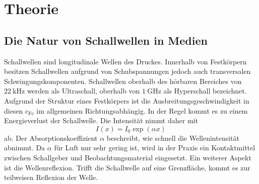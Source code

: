 
\section{Theorie}
\label{sec:Theorie}
\subsection{Die Natur von Schallwellen in Medien}
Schallwellen sind longitudinale Wellen des Druckes.
 Innerhalb von Festkörpern besitzen Schallwellen
aufgrund von Schubspannungen jedoch auch transversalen Schwingungskomponenten.
Schallwellen oberhalb des hörbaren Bereiches von $\SI{22}{\kilo\hertz}$ werden als
Ultraschall, oberhalb von $\SI{1}{\giga\hertz}$ als Hyperschall bezeichnet.
Aufgrund der Struktur eines Festkörpers ist die Ausbreitungsgeschwindigkeit in  diesen $c_\text{Fe}$ im allgemeinen Richtungsabhängig.
In der Regel kommt es zu einem Energieverlust der Schallwelle. Die Intensität nimmt daher mit
\begin{equation}
  I\left(x\right) = I_0 \exp\left(\alpha x\right)\label{I}
\end{equation}
ab. Der Absorptionskoeffizient $\alpha$ beschreibt, wie schnell die Wellenintensität
abnimmt. Da $\alpha$ für Luft nur sehr gering ist, wird in der Praxis ein Kontaktmittel
zwischen Schallgeber und Beobachtungsmaterial eingesetzt. Ein weiterer Aspekt ist die Wellenreflexion.
Trifft die Schallwelle auf eine Grenzfläche, kommt es zur teilweisen Reflexion der Welle.

